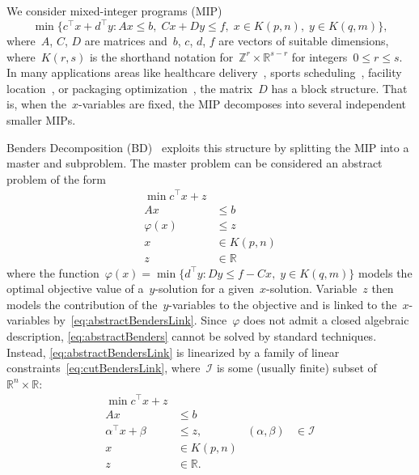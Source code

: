 \documentclass[a4paper,10pt]{article}
\newcommand{\R}{\mathds{R}}
\newcommand{\Z}{\mathds{Z}}
\newcommand{\sprod}[2]{#1^\top #2}
\theoremstyle{definition}
\begin{document}
We consider mixed-integer programs (MIP)
\begin{equation}
  \min\{ \sprod{c}{x} + \sprod{d}{y} : Ax \leq b,\; Cx + Dy \leq f,\; x \in K(p,n),\; y \in K(q, m) \}, \label{eq:generic-MIP}
\end{equation}
where~$A$, $C$, $D$ are matrices and~$b$, $c$, $d$, $f$ are vectors of suitable dimensions, where~$K(r, s)$ is the shorthand notation for~$\Z^r \times \R^{s-r}$ for integers~$0\leq r\leq s$.
In many applications areas like healthcare delivery~\cite{heching2019logic}, sports scheduling~\cite{van2023traditional}, facility location~\cite{fazel2012using}, or packaging optimization~\cite{lehmann2023accelerated}, the matrix~$D$ has a block structure.
That is, when the~$x$-variables are fixed, the MIP decomposes into several independent smaller MIPs.

Benders Decomposition (BD)~\cite{benders1962} exploits this structure by splitting the MIP into a master and subproblem.
The master problem can be considered an abstract problem of the form
\begin{subequations}
  \label{eq:abstractBenders}
  \begin{align}
    \min \sprod{c}{x} + z & \label{eq:abstractBendersObjective}\\
    Ax &\leq b\label{eq:abstractBendersfluff}\\
    \varphi(x) &\leq z \label{eq:abstractBendersLink}\\
    x &\in K(p, n) \\
    z &\in \R
  \end{align}
\end{subequations}  
where the function~$\varphi(x) = \min\{\sprod{d}{y} : Dy \leq f - Cx,\; y \in K(q, m)\}$ models the optimal objective value of a~$y$-solution for a given~$x$-solution.
Variable~$z$ then models the contribution of the~$y$-variables to the objective and is linked to the~$x$-variables by~\eqref{eq:abstractBendersLink}.
Since~$\varphi$ does not admit a closed algebraic description, \eqref{eq:abstractBenders} cannot be solved by standard techniques.
Instead, \eqref{eq:abstractBendersLink} is linearized by a family of linear constraints~\eqref{eq:cutBendersLink}, where~$\mathcal{I}$ is some (usually finite) subset of~$\R^{n} \times \R$:
\begin{subequations}
  \label{eq:cutBenders}
  \begin{align}
    \min \sprod{c}{x} + z &&&\\
    Ax &\leq b&& \label{eq:bendersfluff}\\
    \sprod{\alpha}{x}  + \beta &\leq z, & (\alpha, \beta) &\in \mathcal{I} \label{eq:cutBendersLink} \\
    x &\in K(p, n)\\ 
    z &\in \R.
  \end{align}
\end{subequations}
\end{document}
